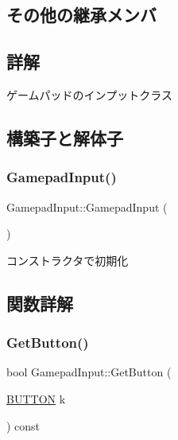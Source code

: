 \subsection*{その他の継承メンバ}


\subsection{詳解}
ゲームパッドのインプットクラス 

\subsection{構築子と解体子}
\mbox{\label{class_gamepad_input_acd9878326e438f379020827d63ebd6cf}} 
\subsubsection{\texorpdfstring{Gamepad\+Input()}{GamepadInput()}}
{\footnotesize\ttfamily Gamepad\+Input\+::\+Gamepad\+Input (\begin{DoxyParamCaption}{ }\end{DoxyParamCaption})}



コンストラクタで初期化 



\subsection{関数詳解}
\mbox{\label{class_gamepad_input_a2bf3c765fd5e4261a0ab56c8871bd614}} 
\subsubsection{\texorpdfstring{Get\+Button()}{GetButton()}}
{\footnotesize\ttfamily bool Gamepad\+Input\+::\+Get\+Button (\begin{DoxyParamCaption}\item[{\mbox{\hyperlink{gamepad__input_8h_a739845b0076428add52ca3cec492e705}{B\+U\+T\+T\+ON}}}]{k }\end{DoxyParamCaption}) const\hspace{0.3cm}{\ttfamily [inline]}}

